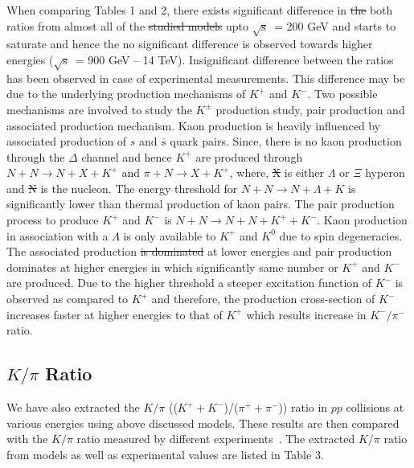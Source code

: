 \documentclass{article}
\newcommand{\sqrts}{\mbox{$\sqrt{\mathrm{s}}$}}
\newcommand{\lam}{$\Lambda$}
\providecommand{\DIFadd}[1]{{\protect\color{blue}\uwave{#1}}} %
\providecommand{\DIFdel}[1]{{\protect\color{red}\sout{#1}}}                      %
\providecommand{\DIFaddbegin}{} %
\providecommand{\DIFaddend}{} %
\providecommand{\DIFdelbegin}{} %
\providecommand{\DIFdelend}{} %
\begin{document}

When comparing Tables 1 and 2, there exists significant difference in \DIFdelbegin \DIFdel{the }\DIFdelend both ratios from almost all of the \DIFdelbegin \DIFdel{studied models }\DIFdelend \DIFaddbegin \DIFadd{models under study }\DIFaddend upto \sqrts~= 200 GeV and starts to saturate and hence the no significant difference is observed towards higher energies (\sqrts~= 900 GeV -- 14 TeV). Insignificant difference between the ratios has been observed in case of experimental measurements. This difference may be due to the underlying production mechanisms of $K^+$ and $K^-$. Two possible mechanisms are involved to study the $K^\pm$ production study, pair production and associated production mechanism. Kaon production is heavily influenced by associated production of $s$ and $\bar s$ quark pairs. Since, there is no kaon production through the $\Delta$ channel and hence $K^+$ are produced through $N + N \rightarrow N + X + K^+$ and $\pi + N \rightarrow X + K^+$, where, \DIFdelbegin \DIFdel{X }\DIFdelend \DIFaddbegin \DIFadd{$X$ }\DIFaddend is either {\lam} or $\Xi$ hyperon and \DIFdelbegin \DIFdel{N }\DIFdelend \DIFaddbegin \DIFadd{$N$ }\DIFaddend is the nucleon. The energy threshold for $N + N \rightarrow N + \Lambda + K$ is significantly lower than thermal production of kaon pairs. The pair production process to produce $K^+$ and $K^-$ is $N + N \rightarrow N + N + K^+ + K^-$. Kaon production in association with a $\Lambda$ is only available to $K^+$ and $K^0$ due to spin degeneracies. The associated production \DIFdelbegin \DIFdel{is dominated }\DIFdelend \DIFaddbegin \DIFadd{dominates }\DIFaddend at lower energies and pair production dominates at higher energies in which significantly same number or $K^+$ and $K^-$ are produced. Due to the higher threshold a steeper excitation function of $K^-$ is observed as compared to $K^+$ and therefore, the production cross-section of $K^-$ increases faster at higher energies to that of $K^+$ which results increase in $K^-/\pi^-$ ratio.           






\subsection{$K/\pi$ Ratio}

We have also extracted the $K/\pi$ (($K^+ + K^-$)/($\pi^+ + \pi^-$)) \DIFaddbegin \DIFadd{yield }\DIFaddend ratio in $pp$ collisions at various energies using above discussed models. These results are then compared with the $K/\pi$ ratio measured by different experiments~\cite{Pulawski:2015tka, NA49:2009brx, PHENIX:2011rvu, STAR:2008med, ALICE:2011gmo, ALICE:2015ial}. The extracted $K/\pi$ ratio from models as well as experimental values are listed in Table 3.     
\end{document}
